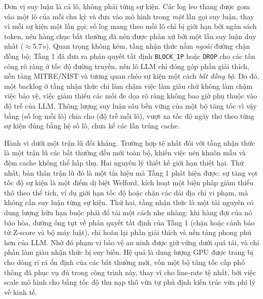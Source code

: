 Đơn vị suy luận là cả lô, không phải từng sự kiện. Các log leo thang được gom vào một lô của mỗi chu kỳ và đưa vào mô hình trong \emph{một} lần gọi suy luận, thay vì mỗi sự kiện một lần gọi; số log mang theo mỗi lô chỉ bị giới hạn bởi ngân sách token, nên hàng chục bất thường đã nén được phân xử bởi một lần suy luận duy nhất ($\approx$5.7\,s). Quan trọng không kém, tầng nhận thức nằm \emph{ngoài} đường chặn đồng bộ: Tầng 1 đã đưa ra phán quyết tất định \texttt{BLOCK\_IP} hoặc \texttt{DROP} cho các tấn công rõ ràng ở tốc độ đường truyền, nên lô LLM chỉ đóng góp phần giải thích, nền tảng MITRE/NIST và tương quan chéo sự kiện một cách \emph{bất đồng bộ}. Do đó, một backlog ở tầng nhận thức chỉ làm chậm việc làm giàu chứ không làm chậm việc bảo vệ, việc giảm thiểu các mối đe dọa rõ ràng không bao giờ phụ thuộc vào độ trễ của LLM. Thông lượng suy luận sâu bền vững của một bộ tăng tốc vì vậy bằng (số log mỗi lô) chia cho (độ trễ mỗi lô), vượt xa tốc độ ngây thơ theo từng sự kiện đúng bằng hệ số lô, chưa kể các lần trúng cache.

Hành vi dưới một trận lũ đối kháng. Trường hợp tệ nhất đối với tầng nhận thức là một trận lũ các bất thường đều mới toàn bộ, khiến việc nén khuôn mẫu và đệm cache không thể hấp thụ. Hai nguyên lý thiết kế giới hạn thiệt hại. Thứ nhất, bản thân trận lũ đó là một tín hiệu mà Tầng 1 phát hiện được: sự tăng vọt tốc độ sự kiện là một điểm dị biệt Welford, kích hoạt một biện pháp giảm thiểu thô theo thể tích, ví dụ giới hạn tốc độ hoặc chặn các dải địa chỉ vi phạm, mà không cần suy luận từng sự kiện. Thứ hai, tầng nhận thức là một tài nguyên có dung lượng hữu hạn buộc phải đổ tải một cách nhẹ nhàng: khi hàng đợi của nó bão hòa, đường ống tụt về phán quyết tất định của Tầng 1 (chặn hoặc cảnh báo từ Z-score và bộ máy luật), chỉ hoãn lại phần giải thích và nền tảng phong phú hơn của LLM. Nhờ đó phạm vi bảo vệ an ninh được giữ vững dưới quá tải, và chỉ phần làm giàu nhận thức bị suy biến. Hệ quả là dung lượng GPU được trang bị cho dòng rỉ rả ổn định của các bất thường mới, vốn một bộ tăng tốc cấp phổ thông đã phục vụ đủ trong công trình này, thay vì cho line-rate tệ nhất, bởi việc scale mô hình cho bằng tốc độ thu nạp thô vừa tự phủ định kiến trúc vừa phi lý về kinh tế.

